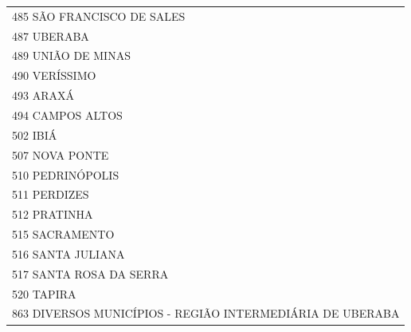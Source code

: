 \documentclass{article}
\begin{document}
\begin{longtable}[c]{m{18cm}}
\multicolumn{1}{l}{ \hspace{2em} 485 SÃO FRANCISCO DE SALES } \\
\multicolumn{1}{l}{ \hspace{2em} 487 UBERABA } \\
\multicolumn{1}{l}{ \hspace{2em} 489 UNIÃO DE MINAS } \\
\multicolumn{1}{l}{ \hspace{2em} 490 VERÍSSIMO } \\
\multicolumn{1}{l}{ \hspace{2em} 493 ARAXÁ } \\
\multicolumn{1}{l}{ \hspace{2em} 494 CAMPOS ALTOS } \\
\multicolumn{1}{l}{ \hspace{2em} 502 IBIÁ } \\
\multicolumn{1}{l}{ \hspace{2em} 507 NOVA PONTE } \\
\multicolumn{1}{l}{ \hspace{2em} 510 PEDRINÓPOLIS } \\
\multicolumn{1}{l}{ \hspace{2em} 511 PERDIZES } \\
\multicolumn{1}{l}{ \hspace{2em} 512 PRATINHA } \\
\multicolumn{1}{l}{ \hspace{2em} 515 SACRAMENTO } \\
\multicolumn{1}{l}{ \hspace{2em} 516 SANTA JULIANA } \\
\multicolumn{1}{l}{ \hspace{2em} 517 SANTA ROSA DA SERRA } \\
\multicolumn{1}{l}{ \hspace{2em} 520 TAPIRA } \\
\multicolumn{1}{l}{ \hspace{2em} 863 DIVERSOS MUNICÍPIOS - REGIÃO INTERMEDIÁRIA DE UBERABA } \\
\end{longtable}
\newpage
\end{document}
